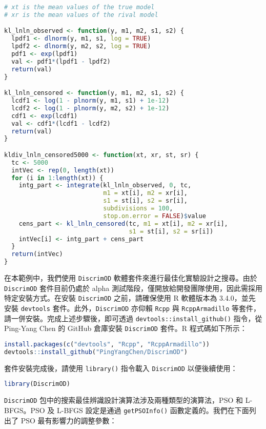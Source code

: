\begin{lstlisting}[language=R, caption={定義KL散度函數}]
# xt is the mean values of the true model
# xr is the mean values of the rival model

kl_lnln_observed <- function(y, m1, m2, s1, s2) {
  lpdf1 <- dlnorm(y, m1, s1, log = TRUE)
  lpdf2 <- dlnorm(y, m2, s2, log = TRUE)
  pdf1 <- exp(lpdf1)
  val <- pdf1*(lpdf1 - lpdf2)
  return(val)
}

kl_lnln_censored <- function(y, m1, m2, s1, s2) {
  lcdf1 <- log(1 - plnorm(y, m1, s1) + 1e-12)
  lcdf2 <- log(1 - plnorm(y, m2, s2) + 1e-12)
  cdf1 <- exp(lcdf1)
  val <- cdf1*(lcdf1 - lcdf2)
  return(val)
}

kldiv_lnln_censored5000 <- function(xt, xr, st, sr) {
  tc <- 5000
  intVec <- rep(0, length(xt))
  for (i in 1:length(xt)) {
    intg_part <- integrate(kl_lnln_observed, 0, tc,
                           m1 = xt[i], m2 = xr[i], 
                           s1 = st[i], s2 = sr[i],
                           subdivisions = 100,
                           stop.on.error = FALSE)$value
    cens_part <- kl_lnln_censored(tc, m1 = xt[i], m2 = xr[i],
                                  s1 = st[i], s2 = sr[i])
    intVec[i] <- intg_part + cens_part
  }
  return(intVec)
}
\end{lstlisting}

在本範例中，我們使用 \verb|DiscrimOD| 軟體套件來進行最佳化實驗設計之搜尋。由於 \verb|DiscrimOD| 套件目前仍處於 alpha 測試階段，僅開放給開發團隊使用，因此需採用特定安裝方式。在安裝 \verb|DiscrimOD| 之前，請確保使用 R 軟體版本為 3.4.0，並先安裝 \verb|devtools| 套件。此外，\verb|DiscrimOD| 亦仰賴 \verb|Rcpp| 與 \verb|RcppArmadillo| 等套件，請一併安裝。完成上述步驟後，即可透過 \verb|devtools::install_github()| 指令，從 Ping-Yang Chen 的 GitHub 倉庫安裝 \verb|DiscrimOD| 套件。R 程式碼如下所示：

\begin{lstlisting}[language=R, caption={安裝 DiscrimOD 套件}]
install.packages(c("devtools", "Rcpp", "RcppArmadillo"))
devtools::install_github("PingYangChen/DiscrimOD")
\end{lstlisting}

套件安裝完成後，請使用 \verb|library()| 指令載入 \verb|DiscrimOD| 以便後續使用：

\begin{lstlisting}[language=R, caption={載入 DiscrimOD 套件}]
library(DiscrimOD)
\end{lstlisting}

\verb|DiscrimOD| 包中的搜索最佳辨識設計演算法涉及兩種類型的演算法，PSO 和 L-BFGS。PSO 及 L-BFGS 設定是通過 \verb|getPSOInfo()| 函數定義的。我們在下面列出了 PSO 最有影響力的調整參數：

